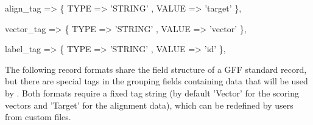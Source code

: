 \documentclass[11pt]{article}
\def\nwendcode{\endtrivlist \endgroup} %
\let\nwdocspar=\par                    %
\begin{document}

\nwenddocs{}\plusendmoddef
align_tag                  => \{ TYPE => 'STRING' , VALUE => 'target' \},
\nwendcode{}\nwdocspar
\nwenddocs{}%
\nwdocspar
\nwenddocs{}%
%
%
%
\nwdocspar

\nwenddocs{}\plusendmoddef
vector_tag                 => \{ TYPE => 'STRING' , VALUE => 'vector' \},
\nwendcode{}\nwdocspar
\nwenddocs{}%
\nwdocspar
\nwenddocs{}%
%
%
%
\nwdocspar

\nwenddocs{}\plusendmoddef
label_tag                  => \{ TYPE => 'STRING' , VALUE => 'id'   \},
\nwendcode{}\nwdocspar
\nwenddocs{}%
\nwdocspar
\nwenddocs{}%
%
%
%
\nwdocspar


The following record formats share the field structure of a GFF standard record, but there are special tags in the grouping fields containing data that will be used by {\prog}. Both formats require a fixed tag string (by default 'Vector' for the scoring vectors and 'Target' for the alignment data), which can be redefined by users from custom files.

\begin{comment}
\todo{
\item {\tt{}{\char37}SOURCE} is a \textbf{provisional varname} that must be replaced by the corresponding {\tt{}{\char36}DefaultVars{\char123}LAYOUT{\char125}}, {\tt{}{\char36}CustomVars{\char123}LAYOUT{\char125}} or {\tt{}{\char36}CmdLineVars{\char123}LAYOUT{\char125}}. Those 'LAYOUT' variables must be set before reading GFF input files because some settings are used by parser functions.
} %
\end{comment}

\end{document}
